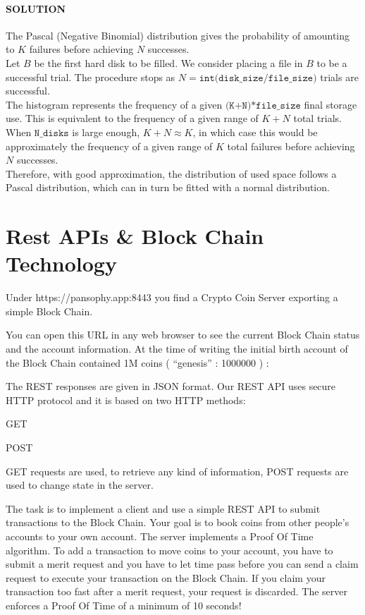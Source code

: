 \documentclass[11pt]{article}
\begin{document}
    \hypertarget{solution}{%
\paragraph{SOLUTION}\label{solution}}

The Pascal (Negative Binomial) distribution gives the probability of
amounting to \(K\) failures before achieving \(N\) successes.\\
Let \(B\) be the first hard disk to be filled. We consider placing a
file in \(B\) to be a successful trial. The procedure stops as
\(N = \texttt{int(disk}\_\texttt{size/file}\_\texttt{size)}\) trials are
successful.\\
The histogram represents the frequency of a given
\(\texttt{(K+N)*file}\_\texttt{size}\) final storage use. This is
equivalent to the frequency of a given range of \(K+N\) total trials.\\
When \(\texttt{N}\_\texttt{disks}\) is large enough, \(K+N \approx K\),
in which case this would be approximately the frequency of a given range
of \(K\) total failures before achieving \(N\) successes.\\
Therefore, with good approximation, the distribution of used space
follows a Pascal distribution, which can in turn be fitted with a normal
distribution.

    \hypertarget{rest-apis-block-chain-technology}{%
\section{Rest APIs \& Block Chain
Technology}\label{rest-apis-block-chain-technology}}

    Under https://pansophy.app:8443 you find a Crypto Coin Server exporting
a simple Block Chain.

You can open this URL in any web browser to see the current Block Chain
status and the account information. At the time of writing the initial
birth account of the Block Chain contained 1M coins ( ``genesis'' :
1000000 ) :

The REST responses are given in JSON format. Our REST API uses secure
HTTP protocol and it is based on two HTTP methods:

GET

POST

GET requests are used, to retrieve any kind of information, POST
requests are used to change state in the server.

The task is to implement a client and use a simple REST API to submit
transactions to the Block Chain. Your goal is to book coins from other
people's accounts to your own account. The server implements a Proof Of
Time algorithm. To add a transaction to move coins to your account, you
have to submit a merit request and you have to let time pass before you
can send a claim request to execute your transaction on the Block Chain.
If you claim your transaction too fast after a merit request, your
request is discarded. The server enforces a Proof Of Time of a minimum
of 10 seconds!
\end{document}
